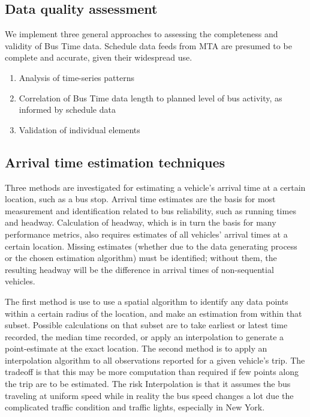 \documentclass[12pt]{report}
\begin{document}
\subsection{Data quality assessment} 
We implement three general approaches to assessing the completeness and validity of Bus Time data.  Schedule data feeds from MTA are presumed to be complete and accurate, given their widespread use.

\begin{enumerate}
\item Analysis of time-series patterns
\item Correlation of Bus Time data length to planned level of bus activity, as informed by schedule data
\item Validation of individual elements
\end{enumerate}



\subsection{Arrival time estimation techniques}

Three methods are investigated for estimating a vehicle's arrival time at a certain location, such as a bus stop. Arrival time estimates are the basis for most measurement and identification related to bus reliability, such as running times and headway.  Calculation of headway, which is in turn the basis for many performance metrics, also requires estimates of all vehicles' arrival times at a certain location. Missing estimates (whether due to the data generating process or the chosen estimation algorithm) must be identified; without them, the resulting headway will be the difference in arrival times of non-sequential vehicles.

The first method is use to use a spatial algorithm to identify any data points within a certain radius of the location, and make an estimation from within that subset. Possible calculations on that subset are to take earliest or latest time recorded, the median time recorded, or apply an interpolation to generate a point-estimate at the exact location. The second method is to apply an interpolation algorithm to all observations reported for a given vehicle's trip. The tradeoff is that this may be more computation than required if few points along the trip are to be estimated.  The risk Interpolation is that it assumes the bus traveling at uniform speed while in reality the bus speed changes a lot due the complicated traffic condition and traffic lights, especially in New York.
\end{document}
